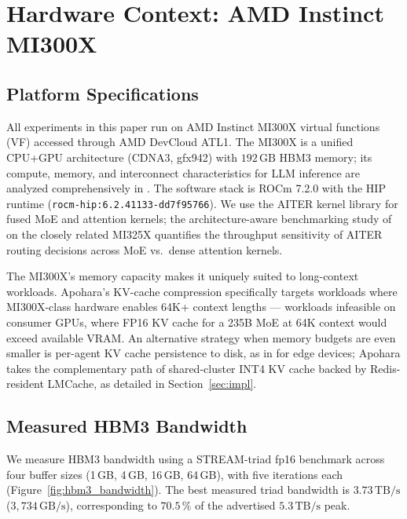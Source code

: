 \documentclass[10pt,twocolumn]{article}
\begin{document}
\section{Hardware Context: AMD Instinct MI300X}
\label{sec:hardware}

\subsection{Platform Specifications}
\label{sec:hardware:specs}

All experiments in this paper run on AMD Instinct MI300X virtual functions
(VF) accessed through AMD DevCloud ATL1. The MI300X is a unified CPU+GPU
architecture (CDNA3, gfx942) with $192\,\mathrm{GB}$ HBM3 memory; its
compute, memory, and interconnect characteristics for LLM inference are
analyzed comprehensively in \cite{mi300xperf}. The software stack is
ROCm 7.2.0 with the HIP runtime
(\texttt{rocm-hip:6.2.41133-dd7f95766}). We use the AITER kernel library
\cite{aiter} for fused MoE and attention kernels; the architecture-aware
benchmarking study of \cite{archawareamd} on the closely related MI325X
quantifies the throughput sensitivity of AITER routing decisions across
MoE vs.\ dense attention kernels.

The MI300X's memory capacity makes it uniquely suited to long-context
workloads. Apohara's KV-cache compression specifically targets workloads where
MI300X-class hardware enables 64K+ context lengths --- workloads infeasible on
consumer GPUs, where FP16 KV cache for a 235B MoE at 64K context would exceed
available VRAM. An alternative strategy when memory budgets are even
smaller is per-agent KV cache persistence to disk, as in
\cite{persistq4kv} for edge devices; Apohara takes the complementary path
of shared-cluster INT4 KV cache backed by Redis-resident LMCache, as
detailed in Section~\ref{sec:impl}.

\subsection{Measured HBM3 Bandwidth}
\label{sec:hardware:bandwidth}

We measure HBM3 bandwidth using a STREAM-triad fp16 benchmark across four
buffer sizes (1\,GB, 4\,GB, 16\,GB, 64\,GB), with five iterations each
(Figure~\ref{fig:hbm3_bandwidth}). The best measured triad bandwidth is
$\mathbf{3.73\,\mathrm{TB/s}}$ ($3{,}734\,\mathrm{GB/s}$), corresponding
to $\mathbf{70.5\,\%}$ of the advertised $5.3\,\mathrm{TB/s}$ peak.
\end{document}
